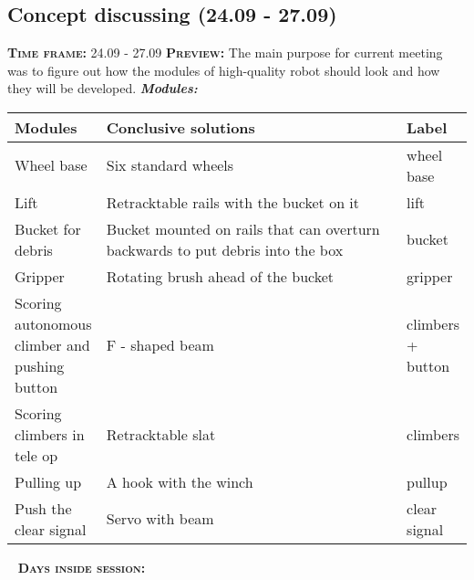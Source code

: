 \subsection{Concept discussing (24.09 - 27.09)}
    \textsc{\textbf{Time frame:}} 24.09 - 27.09 \newline
	\textsc{\textbf{Preview:}} The main purpose for current meeting was to figure out how the modules of high-quality robot should look and how they will be developed.\newline \newline
	\textit{\textbf{Modules:}}
	
	\begin{table}[H]
		\vspace{-2mm}
		\begin{center}
			\begin{tabular}{|p{0.2\linewidth}|p{0.7\linewidth}|p{0.1\linewidth}|}
				\hline
				Modules & Conclusive solutions & Label \\
				\hline
				Wheel base & Six standard wheels & wheel base \\
				\hline
				Lift & Retracktable rails with the bucket on it & lift \\
				\hline
				Bucket for debris & Bucket mounted on rails that can overturn backwards to put debris into the box & bucket \\
				\hline
				Gripper & Rotating brush ahead of the bucket & gripper\\
				\hline
				Scoring autonomous climber and pushing button & F - shaped beam & climbers + button\\
				\hline
				Scoring climbers in tele op & Retracktable slat & climbers\\
				\hline
				Pulling up & A hook with the winch & pullup\\
				\hline
				Push the clear signal & Servo with beam & clear signal\\
				\hline
			\end{tabular}
		\end{center}
	\end{table}
  
   \newline
  \textsc{\textbf{Days inside session:}}
  
  
  
  